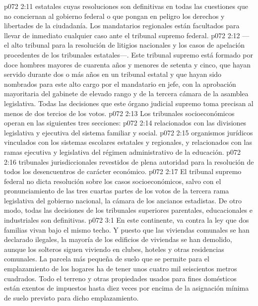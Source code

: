 \vs p072 2:11  estatales cuyas resoluciones son definitivas en todas las cuestiones que no conciernan al gobierno federal o que pongan en peligro los derechos y libertades de la ciudadanía. Los mandatarios regionales están facultados para llevar de inmediato cualquier caso ante el tribunal supremo federal.
\vs p072 2:12  ---el alto tribunal para la resolución de litigios nacionales y los casos de apelación procedentes de los tribunales estatales---. Este tribunal supremo está formado por doce hombres mayores de cuarenta años y menores de setenta y cinco, que hayan servido durante dos o más años en un tribunal estatal y que hayan sido nombrados para este alto cargo por el mandatario en jefe, con la aprobación mayoritaria del gabinete de elevado rango y de la tercera cámara de la asamblea legislativa. Todas las decisiones que este órgano judicial supremo toma precisan al menos de dos tercios de los votos.
\vs p072 2:13 \pc Los tribunales socioeconómicos operan en las siguientes tres secciones:
\vs p072 2:14  relacionados con las divisiones legislativa y ejecutiva del sistema familiar y social.
\vs p072 2:15  organismos jurídicos vinculados con los sistemas escolares estatales y regionales, y relacionados con las ramas ejecutiva y legislativa del régimen administrativo de la educación.
\vs p072 2:16  tribunales jurisdiccionales revestidos de plena autoridad para la resolución de todos los desencuentros de carácter económico.
\vs p072 2:17 \pc El tribunal supremo federal no dicta resolución sobre los casos socioeconómicos, salvo con el pronunciamiento de las tres cuartas partes de los votos de la tercera rama legislativa del gobierno nacional, la cámara de los ancianos estadistas. De otro modo, todas las decisiones de los tribunales superiores parentales, educacionales e industriales son definitivas.
\vs p072 3:1 En este continente, va contra la ley que dos familias vivan bajo el mismo techo. Y puesto que las viviendas comunales se han declarado ilegales, la mayoría de los edificios de viviendas se han demolido, aunque los solteros siguen viviendo en clubes, hoteles y otras residencias comunales. La parcela más pequeña de suelo que se permite para el emplazamiento de los hogares ha de tener unos cuatro mil seiscientos metros cuadrados. Todo el terreno y otras propiedades usados para fines domésticos están exentos de impuestos hasta diez veces por encima de la asignación mínima de suelo previsto para dicho emplazamiento.
